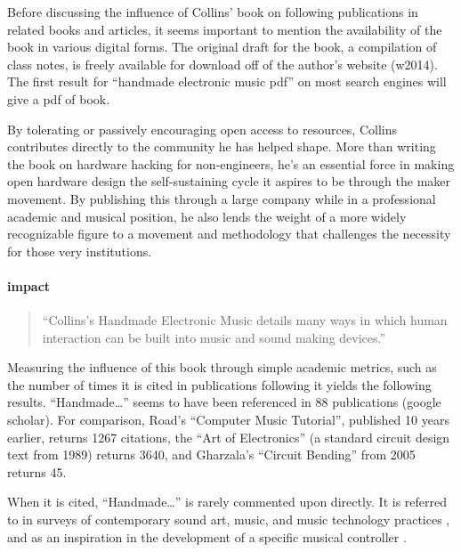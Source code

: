 \begin{itemize}
	Before discussing the influence of Collins’ book on following publications in related books and articles, it seems important to mention the availability of the book in various digital forms. The original draft for the book, a compilation of class notes, is freely available for download off of the author’s website (w2014). The first result for “handmade electronic music pdf” on most search engines will give a pdf of book.

	By tolerating or passively encouraging open access to resources, Collins contributes directly to the community he has helped shape. More than writing the book on hardware hacking for non-engineers, he’s an essential force in making open hardware design the self-sustaining cycle it aspires to be through the maker movement. By publishing this through a large company while in a professional academic and musical position, he also lends the weight of a more widely recognizable figure to a movement and methodology that challenges the necessity for those very institutions.

\paragraph{impact}  

\begin{quote}

“Collins’s Handmade Electronic Music details many ways in which human interaction can be built into music and sound making devices.” \citep{mills2010}

\end{quote}

	Measuring the influence of this book through simple academic metrics, such as the number of times it is cited in publications following it \citep{harzing2008} yields the following results. “Handmade…” seems to have been referenced in 88 publications (google scholar). For comparison, Road’s “Computer Music Tutorial”, published 10 years earlier, returns 1267 citations, the “Art of Electronics” (a standard circuit design text from 1989) returns 3640, and Gharzala’s “Circuit Bending” from 2005 returns 45. 

	When it is cited, “Handmade…” is rarely commented upon directly. It is referred to in surveys of contemporary sound art, music, and music technology practices \citep{kelly2011,mills2010,pigott2011,rodgers2010}, and as an inspiration in the development of a specific musical controller \citep{ariza2007,hoadley2010,murphy2010,riis2013,valle2011}.
	

\end{itemize}
